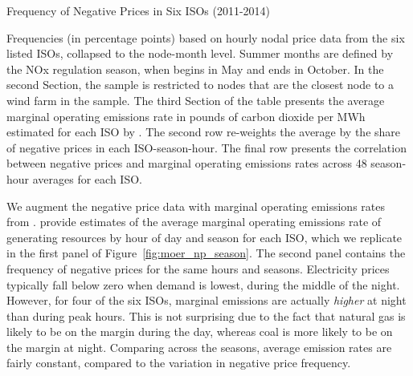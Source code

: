 \documentclass[12pt]{article}
\begin{document}
\begin{table}[h]
    \caption{Frequency of Negative Prices in Six ISOs (2011-2014)\label{tab:Frequency-of-Negative}}
    \vspace{-15pt}
    \footnotesize
    
    
    Frequencies (in percentage points) based on hourly nodal price data from the six listed ISOs, collapsed to the node-month level. Summer months are defined by the NOx regulation season, when begins in May and ends in October. In the second Section, the sample is restricted to nodes that are the closest node to a wind farm in the sample. The third Section of the table presents the average marginal operating emissions rate in pounds of carbon dioxide per MWh estimated for each ISO by \citet{callaway_location_2018}. The second row re-weights the average by the share of negative prices in each ISO-season-hour. The final row presents the correlation between negative prices and marginal operating emissions rates across 48 season-hour averages for each ISO.
\end{table}

We augment the negative price data with marginal operating emissions rates from \citet{callaway_location_2018}. \citet{callaway_location_2018} provide estimates of the average marginal operating emissions rate of generating resources by hour of day and season for each ISO, which we replicate in the first panel of Figure~\ref{fig:moer_np_season}. The second panel contains the frequency of negative prices for the same hours and seasons. Electricity prices typically fall below zero when demand is lowest, during the middle of the night. However, for four of the six ISOs, marginal emissions are actually \emph{higher} at night than during peak hours. This is not surprising due to the fact that natural gas is likely to be on the margin during the day, whereas coal is more likely to be on the margin at night. Comparing across the seasons, average emission rates are fairly constant, compared to the variation in negative price frequency.
\end{document}
